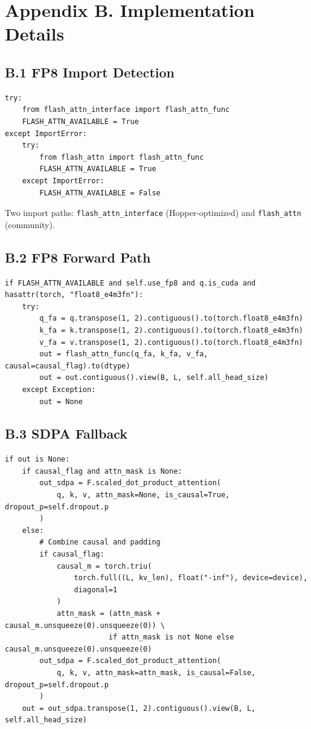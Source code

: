 
\section{Appendix B. Implementation Details}

\subsection{B.1 FP8 Import Detection}

\begin{lstlisting}
try:
    from flash_attn_interface import flash_attn_func
    FLASH_ATTN_AVAILABLE = True
except ImportError:
    try:
        from flash_attn import flash_attn_func
        FLASH_ATTN_AVAILABLE = True
    except ImportError:
        FLASH_ATTN_AVAILABLE = False
\end{lstlisting}

Two import paths: \texttt{flash\_attn\_interface} (Hopper-optimized) and \texttt{flash\_attn} 
(community).

\subsection{B.2 FP8 Forward Path}

\begin{lstlisting}
if FLASH_ATTN_AVAILABLE and self.use_fp8 and q.is_cuda and hasattr(torch, "float8_e4m3fn"):
    try:
        q_fa = q.transpose(1, 2).contiguous().to(torch.float8_e4m3fn)
        k_fa = k.transpose(1, 2).contiguous().to(torch.float8_e4m3fn)
        v_fa = v.transpose(1, 2).contiguous().to(torch.float8_e4m3fn)
        out = flash_attn_func(q_fa, k_fa, v_fa, causal=causal_flag).to(dtype)
        out = out.contiguous().view(B, L, self.all_head_size)
    except Exception:
        out = None
\end{lstlisting}

\subsection{B.3 SDPA Fallback}

\begin{lstlisting}
if out is None:
    if causal_flag and attn_mask is None:
        out_sdpa = F.scaled_dot_product_attention(
            q, k, v, attn_mask=None, is_causal=True, dropout_p=self.dropout.p
        )
    else:
        # Combine causal and padding
        if causal_flag:
            causal_m = torch.triu(
                torch.full((L, kv_len), float("-inf"), device=device),
                diagonal=1
            )
            attn_mask = (attn_mask + causal_m.unsqueeze(0).unsqueeze(0)) \
                        if attn_mask is not None else causal_m.unsqueeze(0).unsqueeze(0)
        out_sdpa = F.scaled_dot_product_attention(
            q, k, v, attn_mask=attn_mask, is_causal=False, dropout_p=self.dropout.p
        )
    out = out_sdpa.transpose(1, 2).contiguous().view(B, L, self.all_head_size)
\end{lstlisting}

